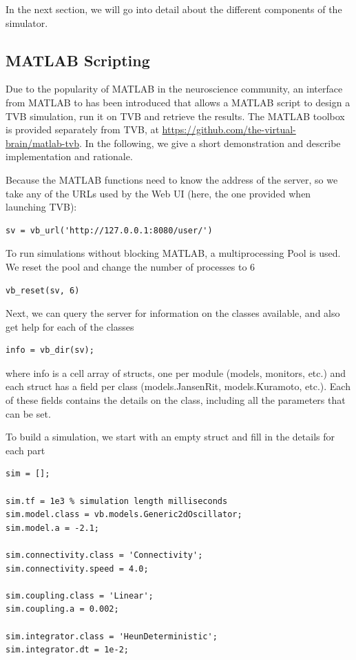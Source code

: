 In the next section, we will go into detail about the different
components of the simulator.

\subsection{MATLAB Scripting}

Due to the popularity of MATLAB in the neuroscience community, an
interface from MATLAB to \TVB has been introduced that allows a MATLAB
script to design a TVB simulation, run it on TVB and retrieve the 
results. The MATLAB toolbox is provided separately from TVB, at
\url{https://github.com/the-virtual-brain/matlab-tvb}.
In the following, we give a short demonstration and 
describe implementation and rationale.

Because the MATLAB functions need to know the address of the server,
so we take any of the URLs used by the Web UI (here, the one provided
when launching TVB):

\begin{lstlisting}
sv = vb_url('http://127.0.0.1:8080/user/')
\end{lstlisting}

To run simulations without blocking MATLAB, a multiprocessing Pool
is used. We reset the pool and change the number of processes to 6

\begin{lstlisting}
vb_reset(sv, 6)
\end{lstlisting}

Next, we can query the server for information on the classes available,
and also get help for each of the classes

\begin{lstlisting}
info = vb_dir(sv);
\end{lstlisting}

\noindent where info is a cell array of structs, one per module (models,
monitors, etc.) and each struct has a field per class (models.JansenRit, 
models.Kuramoto, etc.). Each of these fields contains the details on 
the class, including all the parameters that can be set. 

To build a simulation, we start with an empty struct
and fill in the details for each part

\begin{lstlisting}
sim = [];

sim.tf = 1e3 % simulation length milliseconds
sim.model.class = vb.models.Generic2dOscillator;
sim.model.a = -2.1;

sim.connectivity.class = 'Connectivity';
sim.connectivity.speed = 4.0;

sim.coupling.class = 'Linear';
sim.coupling.a = 0.002;

sim.integrator.class = 'HeunDeterministic';
sim.integrator.dt = 1e-2;
\end{lstlisting}

